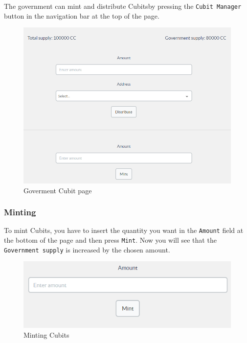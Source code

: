 	The government can mint and distribute Cubits\glosp by pressing the \texttt{Cubit 
	Manager} button in the navigation bar at the top of the page.
	\begin{figure}[H]
		\includegraphics[width=15cm]{res/images/cubit_manager.png}
		\centering
		\caption{Goverment Cubit page}
	\end{figure}
		\subsubsection{Minting}
		To mint Cubits\glo{}, you have to insert the quantity you want in the 
		\texttt{Amount} field at the bottom of the page and then press \texttt{Mint}. Now you will 
		see that the \texttt{Government supply} is increased by the chosen amount.
		\begin{figure}[H]
			\includegraphics[width=15cm]{res/images/minting_cubits.png}
			\centering
			\caption{Minting Cubits}
		\end{figure}
